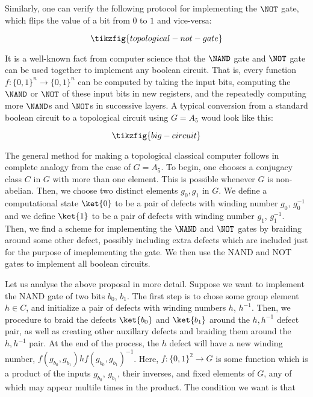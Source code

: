 Similarly, one can verify the following protocol for implementing the $\NOT$ gate, which flips the value of a bit from $0$ to $1$ and vice-versa:

\begin{equation*}
\tikzfig{topological-not-gate}
\end{equation*}

It is a well-known fact from computer science that the $\NAND$ gate and $\NOT$ gate can be used together to implement any boolean circuit. That is, every function $f:\{0,1\}^n\to \{0,1\}^n$ can be computed by taking the input bits, computing the $\NAND$ or $\NOT$ of these input bits in new registers, and the repeatedly computing more $\NAND$s and $\NOT$s in successive layers. A typical conversion from a standard boolean circuit to a topological circuit using $G=A_5$ woud look like this:

\begin{equation*}
\tikzfig{big-circuit}
\end{equation*}


The general method for making a topological classical computer follows in complete analogy from the case of $G=A_5$. To begin, one chooses a conjugacy class $C$ in $G$ with more than one element. This is possible whenever $G$ is non-abelian. Then, we choose two distinct elements $g_0,g_1$ in $G$. We define a computational state $\ket{0}$ to be a pair of defects with winding number $g_0$, $g_0^{-1}$ and we define $\ket{1}$ to be a pair of defects with winding number $g_1$, $g_1^{-1}$. Then, we find a scheme for implementing the $\NAND$ and $\NOT$ gates by braiding around some other defect, possibly including extra defects which are included just for the purpose of imeplementing the gate. We then use the NAND and NOT gates to implement all boolean circuits.

Let us analyse the above proposal in more detail. Suppose we want to implement the NAND gate of two bits $b_0$, $b_1$. The first step is to chose some group element $h\in C$, and initialize a pair of defects with winding numbers $h$, $h^{-1}$. Then, we procedure to braid the defects $\ket{b_0}$ and $\ket{b_1}$ around the $h,h^{-1}$ defect pair, as well as creating other auxillary defects and braiding them around the $h,h^{-1}$ pair. At the end of the process, the $h$ defect will have a new winding number, $f(g_{b_0},g_{b_1})hf(g_{b_0},g_{b_1})^{-1}$. Here, $f:\{0,1\}^2\to G$ is some function which is a product of the inputs $g_{b_0}$, $g_{b_1}$, their inverses, and fixed elements of $G$, any of which may appear multile times in the product. The condition we want is that

